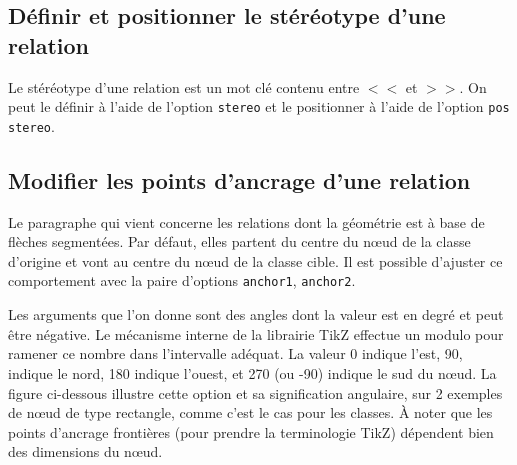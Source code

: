 \documentclass[a4paper,11pt]{report}
\newcommand{\inputTikZ}[1]{%
  }%
\newcommand{\inputTikZ}[1]{%
    \texttt{[image: fig/\#1.pdf]}%
  }%
\newcommand{\TikZ}{{\sc TikZ}}
\begin{document}
\subsection{Définir et positionner le stéréotype d'une relation}\label{ss.relstereo}

Le stéréotype d'une relation est un mot clé contenu entre $<<$ et $>>$. On peut le définir à l'aide de l'option {\tt stereo} et le positionner à l'aide de l'option \hypertarget{posstereo}{{\tt pos stereo}}.

\medskip

\begin{minipage}{0.5\textwidth}

\end{minipage}
\begin{minipage}{0.4\textwidth}
\begin{center}
\inputTikZ{figure19}
\end{center}
\end{minipage}

\subsection{Modifier les points d'ancrage d'une relation}\label{ss.relanchor}

Le paragraphe qui vient concerne les relations dont la géométrie est à base de flèches segmentées. Par défaut, elles partent du centre du n\oe{}ud de la classe d'origine et vont au centre du n\oe{}ud de la classe cible. Il est possible d'ajuster ce comportement avec la paire d'options \hypertarget{anchor1}{{\tt anchor1}}, \hypertarget{anchor2}{{\tt anchor2}}.

\medskip

\begin{minipage}{0.6\textwidth}

\end{minipage}
\begin{minipage}{0.4\textwidth}
\begin{center}
\inputTikZ{figure20}
\end{center}
\end{minipage}

\medskip

Les arguments que l'on donne sont des angles dont la valeur est en degré et peut être négative. Le mécanisme interne de la librairie \TikZ{} effectue un modulo pour ramener ce nombre dans l'intervalle adéquat. La valeur 0 indique l'est, 90, indique le nord, 180 indique l'ouest, et 270 (ou -90) indique le sud du n\oe{}ud. La figure ci-dessous illustre cette option et sa signification angulaire, sur 2 exemples de n\oe{}ud de type rectangle, comme c'est le cas pour les classes. \`{A} noter que les points d'ancrage frontières (pour prendre la terminologie \TikZ) dépendent bien des dimensions du n\oe{}ud.
\end{document}
